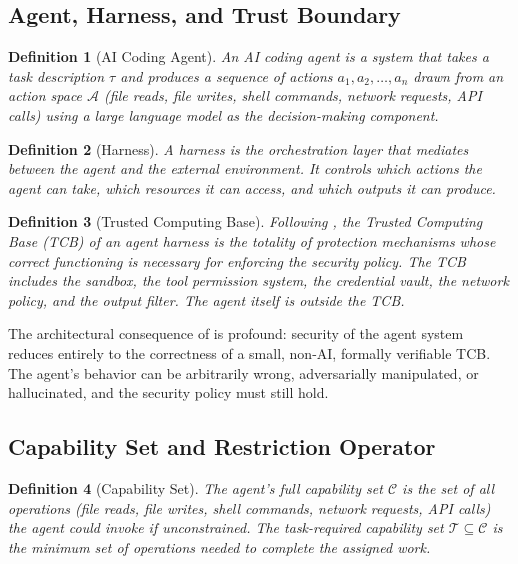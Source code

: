 \documentclass[11pt, a4paper, copyright]{googledeepmind}
\newtheorem{definition}{Definition}[section]
\begin{document}
\subsection{Agent, Harness, and Trust Boundary}

\begin{definition}[AI Coding Agent]
An \emph{AI coding agent} is a system that takes a task description $\tau$ and produces a sequence of actions $a_1, a_2, \ldots, a_n$ drawn from an action space $\mathcal{A}$ (file reads, file writes, shell commands, network requests, API calls) using a large language model as the decision-making component.
\end{definition}

\begin{definition}[Harness]
A \emph{harness} is the orchestration layer that mediates between the agent and the external environment. It controls which actions the agent can take, which resources it can access, and which outputs it can produce.
\end{definition}

\begin{definition}[Trusted Computing Base]
\label{def:tcb}
Following \citet{dod1985orange}, the \emph{Trusted Computing Base} (TCB) of an agent harness is the totality of protection mechanisms whose correct functioning is necessary for enforcing the security policy. The TCB includes the sandbox, the tool permission system, the credential vault, the network policy, and the output filter. The agent itself is \emph{outside} the TCB.
\end{definition}

The architectural consequence of  is profound: security of the agent system reduces entirely to the correctness of a small, non-AI, formally verifiable TCB. The agent's behavior can be arbitrarily wrong, adversarially manipulated, or hallucinated, and the security policy must still hold.

\subsection{Capability Set and Restriction Operator}

\begin{definition}[Capability Set]
\label{def:capability}
The agent's \emph{full capability set} $\mathcal{C}$ is the set of all operations (file reads, file writes, shell commands, network requests, API calls) the agent could invoke if unconstrained. The \emph{task-required capability set} $\mathcal{T} \subseteq \mathcal{C}$ is the minimum set of operations needed to complete the assigned work.
\end{definition}
\end{document}
